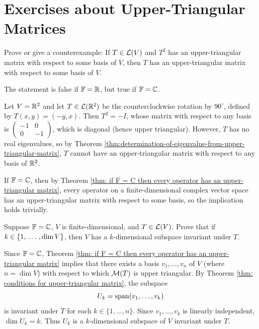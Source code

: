 \section*{Exercises about Upper-Triangular Matrices}

\begin{xrcs}
  Prove or give a counterexample: If $T \in \mathcal{L}(V)$ and $T^2$ has an upper-triangular matrix with respect to some basis of $V$, then $T$ has an upper-triangular matrix with respect to some basis of $V$.

\begin{xsol}
  The statement is false if $\mathbb{F} = \mathbb{R}$, but true if $\mathbb{F} = \mathbb{C}$.

   Let $V = \mathbb{R}^2$ and let $T \in \mathcal{L}(\mathbb{R}^2)$ be the counterclockwise rotation by $90^\circ$, defined by $T(x,y) = (-y, x)$.
  Then $T^2 = -I$, whose matrix with respect to any basis is $\begin{pmatrix} -1 & 0 \\ 0 & -1 \end{pmatrix}$, which is diagonal (hence upper triangular).
  However, $T$ has no real eigenvalues, so by Theorem \ref{thm:determination-of-eigenvalue-from-upper-triangular-matrix}, $T$ cannot have an upper-triangular matrix with respect to any basis of $\mathbb{R}^2$.

   If $\mathbb{F} = \mathbb{C}$, then by Theorem \ref{thm: if F = C then every operator has an upper-triangular matrix}, every operator on a finite-dimensional complex vector space has an upper-triangular matrix with respect to some basis, so the implication holds trivially.
\end{xsol}
\end{xrcs}

\begin{xrcs}
  Suppose $\mathbb{F} = \mathbb{C}$, $V$ is finite-dimensional, and $T \in \mathcal{L}(V)$. Prove that if $k \in \{1, {\, \ldots \,\,}, \dim V\}$, then $V$ has a $k$-dimensional subspace invariant under $T$.

\begin{xprf}
  Since $\mathbb{F} = \mathbb{C}$, Theorem \ref{thm: if F = C then every operator has an upper-triangular matrix} implies that there exists a basis $v_1, \dots, v_n$ of $V$ (where $n = \dim V$) with respect to which $\mathcal{M}(T)$ is upper triangular.
  By Theorem \ref{thm: conditions for upper-triangular matrix}, the subspace
  \[
    U_k = \operatorname{span} (v_1, \dots, v_k)
  \]
  is invariant under $T$ for each $k \in \{1, \dots, n\}$.
  Since $v_1, \dots, v_k$ is linearly independent, $\dim U_k = k$.
  Thus $U_k$ is a $k$-dimensional subspace of $V$ invariant under $T$.
\end{xprf}
\end{xrcs}

